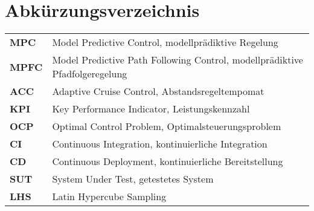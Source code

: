 
\begingroup 
\let\clearpage\relax
\let\cleardoublepage\relax
\let\cleardoublepage\relax

\chapter*{Abkürzungsverzeichnis}
\thispagestyle{empty}
\vspace{-.5em} %
\begin{tabular}{@{} p{\figurelabelwidth} @{} p{\textwidth-\figurelabelwidth}}
\textbf{MPC} & Model Predictive Control, modellprädiktive Regelung\\
\textbf{MPFC} & Model Predictive Path Following Control, modellprädiktive Pfadfolgeregelung\\
\textbf{ACC} & Adaptive Cruise Control, Abstandsregeltempomat\\
\textbf{KPI} & Key Performance Indicator, Leistungskennzahl\\
\textbf{OCP} & Optimal Control Problem, Optimalsteuerungsproblem \\
\textbf{CI} & Continuous Integration, kontinuierliche Integration\\
\textbf{CD} & Continuous Deployment, kontinuierliche Bereitstellung\\
\textbf{SUT} & System Under Test, getestetes System\\
\textbf{LHS} & Latin Hypercube Sampling\\
\end{tabular}                
\endgroup
\cleardoublepage